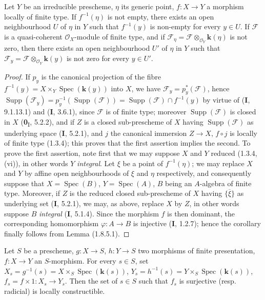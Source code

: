 \begin{corollary}[1.8.6]
\label{IV.1.8.6}
Let $Y$ be an irreducible prescheme, $\eta$ its generic point,
$f:X\to Y$ a morphism locally of finite type. If $f^{-1}(\eta)$ is not
empty, there exists an open neighbourhood $U$ of $\eta$ in $Y$ such that
$f^{-1}(y)$ is non-empty for every $y\in U$. If $\mathscr F$ is a
quasi-coherent $\mathcal O_X$-module of finite type, and if
$\mathscr F_\eta=\mathscr F\otimes_{\mathcal O_Y}\boldsymbol{k}(\eta)$ is not zero,
then there exists an open neighbourhood $U'$ of $\eta$ in $Y$ such that
$\mathscr F_y=\mathscr F\otimes_{\mathcal O_Y}\boldsymbol{k}(y)$ is not zero for
every $y\in U'$.
\end{corollary}

\begin{proof}
If $p_y$ is the canonical projection of the fibre
$f^{-1}(y)=X\times_Y\operatorname{Spec}(\boldsymbol{k}(y))$ into $X$, we have
$\mathscr F_y=p_y^*(\mathscr F)$, hence
$\operatorname{Supp}(\mathscr F_y)=p_y^{-1}(\operatorname{Supp}(\mathscr F))
=\operatorname{Supp}(\mathscr F)\cap f^{-1}(y)$ by virtue of (\textbf{I}, 9.1.13.1) and
(\textbf{I}, 3.6.1), since $\mathscr F$ is of finite type; moreover
$\operatorname{Supp}(\mathscr F)$ is closed in $X$ (\textbf{0}\textsubscript{I},
5.2.2), and if $Z$ is a closed sub-prescheme of $X$ having
$\operatorname{Supp}(\mathscr F)$ as underlying space (\textbf{I}, 5.2.1), and $j$ the
canonical immersion $Z\to X$, $f\circ j$ is locally of finite type (1.3.4);
this proves that the first assertion implies the second. To prove the
first assertion, note first that we may suppose $X$ and $Y$
reduced (1.3.4, (vi)), in other words $Y$ \emph{integral}. Let $\xi$ be a point of
$f^{-1}(\eta)$; we may replace $X$ and $Y$ by affine open neighbourhoods of
$\xi$ and $\eta$ respectively, and consequently suppose that
$X=\operatorname{Spec}(B)$, $Y=\operatorname{Spec}(A)$, $B$ being an
$A$-algebra of finite type. Moreover, if $Z$ is the reduced closed
sub-prescheme of $X$ having $\overline{\{\xi\}}$ as underlying set
(\textbf{I}, 5.2.1), we may, as above, replace $X$ by $Z$, in other words suppose $B$
\emph{integral} (\textbf{I}, 5.1.4). Since the morphism $f$ is then dominant,
the corresponding homomorphism $\varphi:A\to B$ is injective (\textbf{I}, 1.2.7);
hence the corollary finally follows from Lemma (1.8.5.1).
\end{proof}


\begin{proposition}[1.8.7]
\label{IV.1.8.7}
Let $S$ be a prescheme, $g:X\to S$, $h:Y\to S$ two morphisms of finite
presentation, $f:X\to Y$ an $S$-morphism. For every $s\in S$, set
$X_s=g^{-1}(s)=X\times_S\operatorname{Spec}(\boldsymbol{k}(s))$,
$Y_s=h^{-1}(s)=Y\times_S\operatorname{Spec}(\boldsymbol{k}(s))$,
$f_s=f\times 1:X_s\to Y_s$. Then the set of $s\in S$ such that $f_s$
is surjective (\textup{resp.} radicial) is locally constructible.
\end{proposition}

